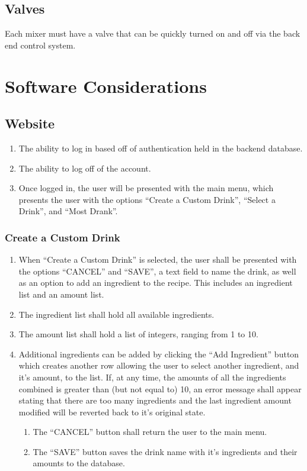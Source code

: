 {	\subsection{Valves}
    Each mixer must have a valve that can be quickly turned on and off via the back end control system.


    \section{Software Considerations}
    
    
        
    \subsection{Website}

    \begin{enumerate}
        \item The ability to log in based off of authentication held in the backend database.
    	\item The ability to log off of the account.
    	\item Once logged in, the user will be presented with the main menu, which presents the user with the options ``Create a Custom Drink'', ``Select a Drink'', and ``Most Drank''.
    \end{enumerate}
    
    \subsubsection{Create a Custom Drink}

        \begin{enumerate}
           
           \item When ``Create a Custom Drink'' is selected, the user shall be presented with the options ``CANCEL'' and ``SAVE'', a text field to name the drink, as well as an option to add an ingredient to the recipe. This includes an ingredient list and an amount list.
			\item The ingredient list shall hold all available ingredients.
			\item The amount list shall hold a list of integers, ranging from 1 to 10.
			\item Additional ingredients can be added by clicking the ``Add Ingredient'' button which creates another row allowing the user to select another ingredient, and it's amount, to the list. If, at any time, the amounts of all the ingredients combined is greater than (but not equal to) 10, an error message shall appear stating that there are too many ingredients and the last ingredient amount modified will be reverted back to it's original state.
			\begin{enumerate}
				\item The ``CANCEL'' button shall return the user to the main menu.
				\item The ``SAVE'' button saves the drink name with it's ingredients and their amounts to the database.
			\end{enumerate}
            

\end{enumerate}}
